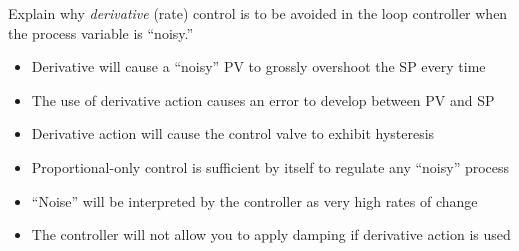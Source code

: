 Explain why {\it derivative} (rate) control is to be avoided in the loop controller when the process variable is ``noisy.''

\begin{itemize}
\item{} Derivative will cause a ``noisy'' PV to grossly overshoot the SP every time
\vskip 5pt 
\item{} The use of derivative action causes an error to develop between PV and SP
\vskip 5pt 
\item{} Derivative action will cause the control valve to exhibit hysteresis
\vskip 5pt 
\item{} Proportional-only control is sufficient by itself to regulate any ``noisy'' process
\vskip 5pt 
\item{} ``Noise'' will be interpreted by the controller as very high rates of change
\vskip 5pt 
\item{} The controller will not allow you to apply damping if derivative action is used
\end{itemize}




